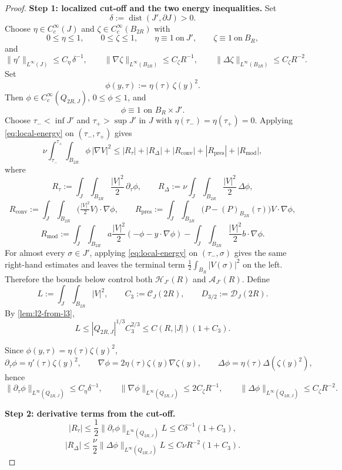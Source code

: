 \documentclass[11pt]{amsart}
\theoremstyle{plain}
\theoremstyle{definition}
\theoremstyle{remark}
\begin{document}
\begin{proof}
\textbf{Step 1: localized cut-off and the two energy inequalities.}
Set
\[
\delta:=\operatorname{dist}(J',\partial J)>0.
\]
Choose $\eta\in C_c^\infty(J)$ and $\zeta\in C_c^\infty(B_{2R})$ with
\[
0\le\eta\le1,\qquad
0\le\zeta\le1,\qquad
\eta\equiv1\ \text{on}\ J',\qquad
\zeta\equiv1\ \text{on}\ B_R,
\]
and
\[
\|\eta'\|_{L^\infty(J)}\le C_\eta\,\delta^{-1},
\qquad
\|\nabla\zeta\|_{L^\infty(B_{2R})}\le C_\zeta R^{-1},
\qquad
\|\Delta\zeta\|_{L^\infty(B_{2R})}\le C_\zeta R^{-2}.
\]
Set
\[
\phi(y,\tau):=\eta(\tau)\,\zeta(y)^2.
\]
Then $\phi\in C_c^\infty(Q_{2R,J})$, $0\le\phi\le1$, and
\[
\phi\equiv1\text{ on }B_R\times J'.
\]
Choose $\tau_-<\inf J'$ and $\tau_+>\sup J'$ in $J$ with
$\eta(\tau_-)=\eta(\tau_+)=0$. Applying \eqref{eq:local-energy} on
$(\tau_-,\tau_+)$ gives
\[
\nu\int_{\tau_-}^{\tau_+}\!\int_{B_{2R}}\phi\,|\nabla V|^2
\le |R_\tau|+|R_\Delta|+|R_{\mathrm{conv}}|+|R_{\mathrm{pres}}|+|R_{\mathrm{mod}}|,
\]
where
\[
R_\tau:=\int_J\!\int_{B_{2R}}\frac{|V|^2}{2}\,\partial_\tau\phi,\qquad
R_\Delta:=\nu\int_J\!\int_{B_{2R}}\frac{|V|^2}{2}\,\Delta\phi,
\]
\[
R_{\mathrm{conv}}:=\int_J\!\int_{B_{2R}}\bigl(\tfrac{|V|^2}{2}V\bigr)\cdot\nabla\phi,\qquad
R_{\mathrm{pres}}:=\int_J\!\int_{B_{2R}}\bigl(P-(P)_{B_{2R}}(\tau)\bigr)V\cdot\nabla\phi,
\]
\[
R_{\mathrm{mod}}:=\int_J\!\int_{B_{2R}}
a\frac{|V|^2}{2}(-\phi-y\cdot\nabla\phi)
-\int_J\!\int_{B_{2R}}\frac{|V|^2}{2}b\cdot\nabla\phi.
\]
For almost every $\sigma\in J'$, applying \eqref{eq:local-energy} on
$(\tau_-,\sigma)$ gives the same right-hand estimates and leaves the terminal
term $\frac12\int_{B_R}|V(\sigma)|^2$ on the left. Therefore the bounds below
control both $\mathcal H_{J'}(R)$ and $\mathcal A_{J'}(R)$.
Define
\[
L:=\int_J\!\int_{B_{2R}}|V|^2,\qquad
C_3:=\mathcal C_J(2R),\qquad D_{3/2}:=\mathcal D_J(2R).
\]
By \cref{lem:l2-from-l3},
\[
L\le |Q_{2R,J}|^{1/3}C_3^{2/3}\le C(R,|J|)(1+C_3).
\]

Since $\phi(y,\tau)=\eta(\tau)\zeta(y)^2$,
\[
\partial_\tau\phi=\eta'(\tau)\zeta(y)^2,
\qquad
\nabla\phi=2\eta(\tau)\zeta(y)\nabla\zeta(y),
\qquad
\Delta\phi=\eta(\tau)\Delta(\zeta(y)^2),
\]
hence
\[
\|\partial_\tau\phi\|_{L^\infty(Q_{2R,J})}\le C_\eta\delta^{-1},
\qquad
\|\nabla\phi\|_{L^\infty(Q_{2R,J})}\le 2C_\zeta R^{-1},
\qquad
\|\Delta\phi\|_{L^\infty(Q_{2R,J})}\le C_\zeta R^{-2}.
\]

\textbf{Step 2: derivative terms from the cut-off.}
\[
|R_\tau|
\le\frac12\|\partial_\tau\phi\|_{L^\infty(Q_{2R,J})}L
\le C\delta^{-1}(1+C_3),
\]
\[
|R_\Delta|
\le\frac{\nu}{2}\|\Delta\phi\|_{L^\infty(Q_{2R,J})}L
\le C\nu R^{-2}(1+C_3).
\]


\end{proof}
\end{document}
